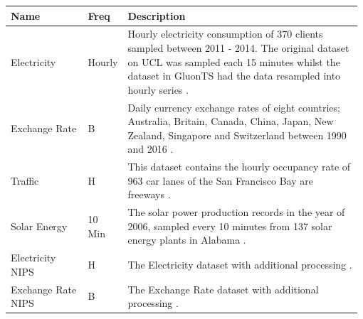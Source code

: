 \begin{table}[h]
  \centering
  \begin{tabular}{p{0.22\linewidth} | p{0.09\linewidth} | p{0.67\linewidth}}
    Name               & Freq   & Description                                                                                                                                                                                                                                                       \\ \hline
    Electricity        & Hourly & Hourly electricity consumption of 370 clients sampled between 2011 - 2014. The original dataset on UCL was sampled each 15 minutes whilst the dataset in GluonTS had the data resampled into hourly series \cite{gluonts-website, salinas_high-dimensional_2019}. \\
    \hline
    Exchange Rate      & B      & Daily currency exchange rates of eight countries; Australia, Britain, Canada, China, Japan, New Zealand, Singapore and Switzerland between 1990 and 2016  \cite{lai_modeling_2018}.                                                                               \\
    \hline
    Traffic            & H      & This dataset contains the hourly occupancy rate of 963 car lanes of the San Francisco Bay are freeways \cite{gluonts-github}.                                                                                                                                     \\
    \hline
    Solar Energy       & 10 Min & The solar power production records in the year of 2006, sampled every 10 minutes from 137 solar energy plants in Alabama \cite{lai_modeling_2018}.                                                                                                                \\
    \hline
    Electricity NIPS   & H      & The Electricity dataset with additional processing \cite{salinas_high-dimensional_2019}.                                                                                                                                                                          \\
    \hline
    Exchange Rate NIPS & B      & The Exchange Rate dataset with additional processing \cite{salinas_high-dimensional_2019}.                                                                                                                                                                        \\
    \hline

\end{tabular}
\end{table}
